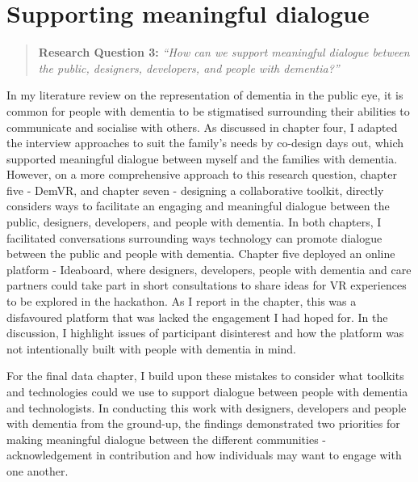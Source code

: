\section{Supporting meaningful dialogue}
\label{Discussion:RQ3}
\begin{quote}
\textbf{    Research Question 3:
}    
\textit{    “How can we support meaningful dialogue between the public, designers, developers, and people with dementia?”}
\end{quote}
In my literature review on the representation of dementia in the public eye, it is common for people with dementia to be stigmatised surrounding their abilities to communicate and socialise with others. As discussed in chapter four, I adapted the interview approaches to suit the family's needs by co-design days out, which supported meaningful dialogue between myself and the families with dementia. However, on a more comprehensive approach to this research question, chapter five - DemVR, and chapter seven - designing a collaborative toolkit, directly considers ways to facilitate an engaging and meaningful dialogue between the public, designers, developers, and people with dementia. In both chapters, I facilitated conversations surrounding ways technology can promote dialogue between the public and people with dementia. Chapter five deployed an online platform - Ideaboard, where designers, developers, people with dementia and care partners could take part in short consultations to share ideas for VR experiences to be explored in the hackathon. As I report in the chapter, this was a disfavoured platform that was lacked the engagement I had hoped for. In the discussion, I highlight issues of participant disinterest and how the platform was not intentionally built with people with dementia in mind. 

For the final data chapter, I build upon these mistakes to consider what toolkits and technologies could we use to support dialogue between people with dementia and technologists. In conducting this work with designers, developers and people with dementia from the ground-up, the findings demonstrated two priorities for making meaningful dialogue between the different communities - acknowledgement in contribution and how individuals may want to engage with one another.

